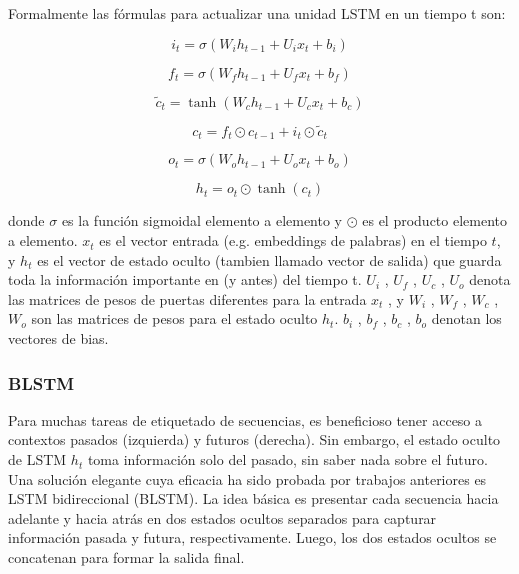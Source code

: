 \documentclass[runningheads]{llncs}
\begin{document}
\newpage

Formalmente las fórmulas para actualizar una unidad LSTM en un tiempo t son:

\begin{equation}
i_{t} = \sigma(W_{i} h_{t-1} + U_{i} x_{t} + b_{i})
\end{equation}

\begin{equation}
f_{t} = \sigma(W_{f} h_{t-1} + U_{f} x_{t} + b_{f})
\end{equation}

\begin{equation}
\tilde{c}_{t} = \tanh(W_{c} h_{t-1} + U_{c} x_{t} + b_{c})
\end{equation}

\begin{equation}
c_{t} = f_{t} \odot c_{t-1} + i_{t} \odot \tilde{c}_{t}
\end{equation}

\begin{equation}
o_t = \sigma(W_{o} h_{t-1} + U_{o} x_{t} + b_{o})
\end{equation}

\begin{equation}
h_{t} = o_{t} \odot \tanh( c_{t})
\end{equation}



donde $\sigma$ es la función sigmoidal elemento a elemento y $\odot$ es el producto elemento a elemento. 
$x_{t}$ es el  vector entrada (e.g. embeddings de palabras) en el tiempo $t$, y $h_{t}$ es el 
vector de estado oculto (tambien llamado vector de salida) que guarda toda la información importante 
en (y antes) del tiempo  t. $U_{i}$ , $U_{f}$ , $U_{c}$ , $U_{o}$ denota las matrices de pesos de 
puertas diferentes para la entrada $x_{t}$ , y $W_{i}$ , $W_{f}$ , $ W_{c}$ , $W_{o}$ son las
matrices de pesos para el estado oculto $h_{t}$. $b_{i}$ , $b_{f}$ , $b_{c}$ , $b_{o}$ denotan los 
vectores de bias.

\subsubsection{BLSTM}

Para muchas tareas de etiquetado de secuencias, es beneficioso tener acceso a contextos pasados 
(izquierda) y futuros (derecha). Sin embargo, el estado oculto de LSTM $h_{t}$ toma información 
solo del pasado, sin saber nada sobre el futuro. Una solución elegante cuya eficacia ha sido probada 
por trabajos anteriores es LSTM bidireccional (BLSTM). La idea básica es presentar 
cada secuencia hacia adelante y hacia atrás en dos estados ocultos separados para capturar información 
pasada y futura, respectivamente. Luego, los dos estados ocultos se concatenan para formar la salida 
final.
\end{document}
